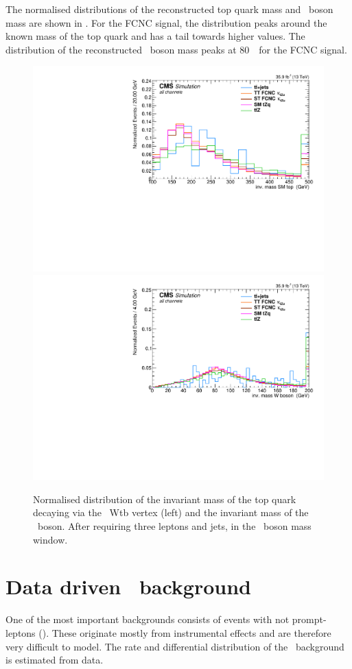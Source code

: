  The normalised distributions of the reconstructed top quark mass and \PW\ boson mass are shown in . For the FCNC signal, the distribution peaks around the known mass of the top quark and has a tail towards higher values. The distribution of the reconstructed \PW\ boson mass peaks at 80~\GeV\ for the FCNC signal.
\begin{figure}[tbph]
	\centering
	\includegraphics[width=0.49\linewidth]{5_EventSelection/Figures/3lepcontrol_dilep_SMTopMass_all_Normalized}
	\includegraphics[width=0.49\linewidth]{5_EventSelection/Figures/3lepcontrol_dilep_WbosonMass_all_Normalized}
	\caption{Normalised distribution of the invariant mass of the top quark  decaying via the \SM\ Wtb vertex (left) and the invariant mass of the \PW\ boson. After requiring three leptons and jets, in the \PZ\ boson mass window.}
	\label{fig:topmasss}
\end{figure}
 
 \clearpage
\section{Data driven \NPL\ background}
\label{sec:NPL}
 One of the most important backgrounds consists of events with not prompt-leptons (\NPL). These originate mostly from instrumental effects and are therefore very difficult to model. The rate and differential distribution of the \NPL\ background  is estimated from data. 

